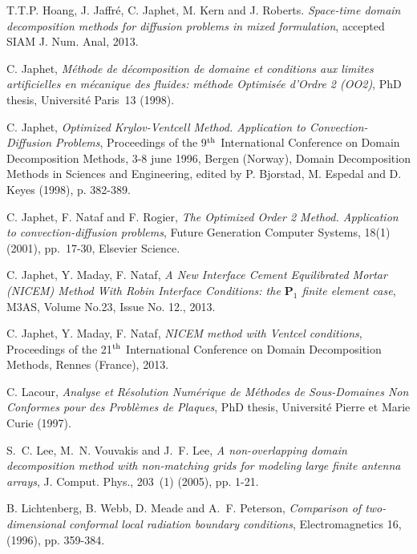 \documentclass[final]{siamltex}
\begin{document}
\begin{thebibliography}{10}
 {\sc T.T.P. Hoang, J. Jaffr\'e, C. Japhet, M. Kern and J. Roberts}.
  {\em Space-time domain decomposition methods for diffusion problems in mixed formulation},
  accepted SIAM J. Num. Anal, 2013.

 {\sc C. Japhet}, {\em M\'ethode de d\'ecomposition de domaine et conditions
                  aux limites artificielles en m\'ecanique des fluides:
                  m\'ethode Optimis\'ee d'Ordre 2 (OO2)}, PhD thesis, Universit\'e Paris~13 (1998).

 {\sc C. Japhet}, {\em Optimized Krylov-Ventcell
  Method.  Application to Convection-Diffusion Problems}, Proceedings
  of the 9$^{\text{\scriptsize th}}$ International Conference on
  Domain Decomposition Methods, 3-8 june 1996, Bergen (Norway), Domain
  Decomposition Methods in Sciences and Engineering, edited by
  P. Bjorstad, M. Espedal and D. Keyes (1998), p. 382-389.
  
 {\sc C. Japhet, F. Nataf and F. Rogier}, {\em The
  Optimized Order 2 Method. Application to convection-diffusion
  problems}, Future Generation Computer Systems, 18(1) (2001),
  pp.~17-30, Elsevier Science.

 {\sc C. Japhet, Y. Maday, F. Nataf},  
{\it A {N}ew {I}nterface {C}ement {E}quilibrated {M}ortar (NICEM) {M}ethod {W}ith {R}obin {I}nterface {C}onditions:
  the ${\mathbf{P}}_1$ finite element case}, M3AS, Volume No.23, Issue No. 12., 2013.

 {\sc C. Japhet, Y. Maday, F. Nataf},  
{\it NICEM method with Ventcel conditions}, Proceedings
  of the 21$^{\text{\scriptsize th}}$ International Conference on
  Domain Decomposition Methods, Rennes (France), 2013.

 {\sc C. Lacour}, {\em Analyse et R\'esolution
  Num\'erique de M\'ethodes de Sous-Domaines Non Conformes pour des
  Probl\`emes de Plaques}, PhD thesis, Universit\'e Pierre et Marie
  Curie (1997).

  {\sc S.~C. Lee, M.~N. Vouvakis and J.~F. Lee}, {\em
  A non-overlapping domain decomposition method with non-matching
  grids for modeling large finite antenna arrays}, J. Comput. Phys.,
  203~(1) (2005), pp. 1-21.
  
 {\sc B. Lichtenberg, B. Webb, D. Meade and
  A.~F. Peterson}, {\em Comparison of two-dimensional conformal local
  radiation boundary conditions}, Electromagnetics 16, (1996),
  pp. 359-384.
  

\end{thebibliography}
\end{document}
